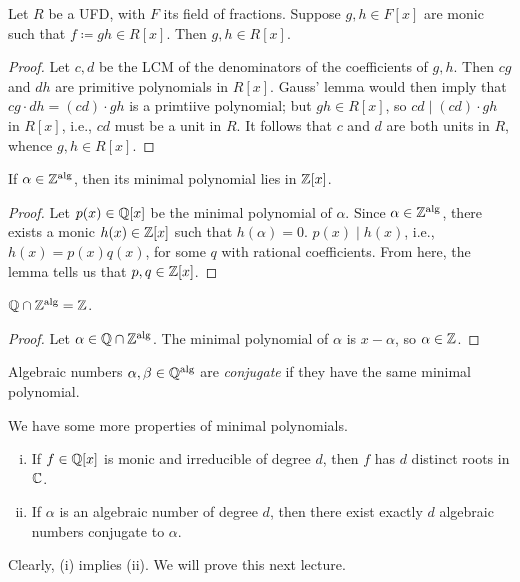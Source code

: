 \newpage
\begin{lemma} \label{lem:coefficients_in_ring}
    Let $R$ be a UFD, with $F$ its field of fractions. Suppose $g, h \in F[x]$ are monic such that $f \coloneq gh \in R[x]$. Then $g, h \in R[x]$.
\end{lemma}
\begin{proof}
    Let $c, d$ be the LCM of the denominators of the coefficients of $g, h$. Then $cg$ and $dh$ are primitive polynomials in $R[x]$. Gauss' lemma would then imply that $cg \cdot dh = (cd) \cdot gh$ is a primtiive polynomial; but $gh \in R[x]$, so $cd \mid (cd) \cdot gh$ in $R[x]$, i.e., $cd$ must be a unit in $R$. It follows that $c$ and $d$ are both units in $R$, whence $g, h \in R[x]$.
\end{proof}

\begin{corollary} \label{cor:minpoly_of_alg_int_is_in_Z[x]}
    If $\alpha \in \operatorname{\mathbb Z^{\operatorname{alg}}}$, then its minimal polynomial lies in $\mathbb Z[x]$.
\end{corollary}
\begin{proof}
    Let $p(x) \in \mathbb Q[x]$ be the minimal polynomial of $\alpha$. Since $\alpha \in \operatorname{\mathbb Z^{\operatorname{alg}}}$, there exists a monic $h(x) \in \mathbb Z[x]$ such that $h(\alpha) = 0$. $p(x) \mid h(x)$, i.e., $h(x) = p(x) q(x)$, for some $q$ with rational coefficients. From here, the lemma tells us that $p, q \in \mathbb Z[x]$.
\end{proof}

\begin{corollary} \label{cor:intersection_of_Q_and_alg_int}
    $\mathbb Q \cap \operatorname{\mathbb Z^{\operatorname{alg}}} = \mathbb Z$.
\end{corollary}
\begin{proof}
    Let $\alpha \in \mathbb Q \cap \operatorname{\mathbb Z^{\operatorname{alg}}}$. The minimal polynomial of $\alpha$ is $x - \alpha$, so $\alpha \in \mathbb Z$.
\end{proof}

\begin{definition} \label{defn:conjugate}
    Algebraic numbers $\alpha, \beta \in \operatorname{\mathbb Q^{\operatorname{alg}}}$ are \textit{conjugate} if they have the same minimal polynomial.
\end{definition}

\begin{lemma}
    We have some more properties of minimal polynomials.
    \begin{enumerate}[(i)]
        \item If $f \in \mathbb Q[x]$ is monic and irreducible of degree $d$, then $f$ has $d$ distinct roots in $\mathbb C$.
        \item If $\alpha$ is an algebraic number of degree $d$, then there exist exactly $d$ algebraic numbers conjugate to $\alpha$.
    \end{enumerate}
\end{lemma}
Clearly, (i) implies (ii). We will prove this next lecture.